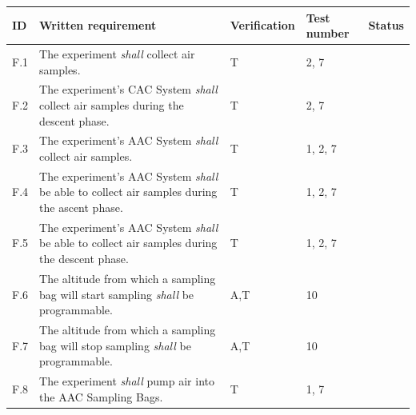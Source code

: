 \documentclass[a4paper,12pt,twoside]{article}
\begin{document}
\begin{longtable}[]{|m{}| m{} |m{} |m{}|m{}|}

\hline
ID   & Written requirement                                                                                                                                                     & Verification & Test number & Status \\ \hline
F.1  & The experiment \textit{shall} collect air samples.                                                                                                                               &      T        &  2, 7           &        \\ \hline
F.2  & The experiment's CAC System \textit{shall} collect air samples during the descent phase.                                                                                         &      T        &  2, 7           &        \\ \hline
F.3  & The experiment's AAC System \textit{shall} collect air samples.                                                                                                                  &     T         &  1, 2, 7           &        \\ \hline
F.4  & The experiment's AAC System \textit{shall} be able to collect air samples during the ascent phase.                                                                               &     T         & 1, 2, 7     &        \\ \hline
F.5  & The experiment's AAC System \textit{shall} be able to collect air samples during the descent phase.                                                                              &      T        & 1, 2, 7    &        \\ \hline
F.6  & The altitude from which a sampling bag will start sampling \textit{shall} be programmable.                                                                                       &     A,T         &  10           &        \\ \hline
F.7  & The altitude from which a sampling bag will stop sampling \textit{shall} be programmable.                                                                                        &    A,T          & 10            &        \\ \hline
F.8  & The experiment \textit{shall} pump air into the AAC Sampling Bags.                                                                                                               &     T        & 1, 7            &        \\ \hline

\end{longtable}
\end{document}
